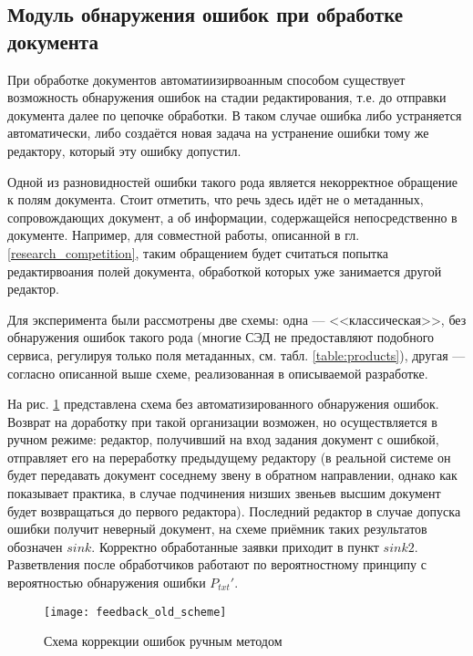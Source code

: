 \subsection{Модуль обнаружения ошибок при обработке документа} \label{research_feedback}

При обработке документов автоматиизирвоанным способом существует возможность обнаружения ошибок на стадии редактирования, т.е. до отправки документа далее по цепочке обработки. В таком случае ошибка либо устраняется автоматически, либо создаётся новая задача на устранение ошибки тому же редактору, который эту ошибку допустил.

\vspace{\baselineskip}
Одной из разновидностей ошибки такого рода является некорректное обращение к полям документа. Стоит отметить, что речь здесь идёт не о метаданных, сопровождающих документ, а об информации, содержащейся непосредственно в документе. Например, для совместной работы, описанной в гл. \ref{research_competition}, таким обращением будет считаться попытка редактирвоания полей документа, обработкой которых уже занимается другой редактор.

\vspace{\baselineskip}
Для эксперимента были рассмотрены две схемы: одна --- <<классическая>>, без обнаружения ошибок такого рода (многие СЭД не предоставляют подобного сервиса, регулируя только поля метаданных, см. табл. \ref{table:products}), другая --- согласно описанной выше схеме, реализованная в описываемой разработке.

\vspace{\baselineskip}
На рис. \ref{img:feedback_old_scheme} представлена схема без автоматизированного обнаружения ошибок. Возврат на доработку при такой организации возможен, но осуществляется в ручном режиме: редактор, получивший на вход задания документ с ошибкой, отправляет его на переработку предыдущему редактору (в реальной системе он будет передавать документ соседнему звену в обратном направлении, однако как показывает практика, в случае подчинения низших звеньев высшим документ будет возвращаться до первого редактора). Последний редактор в случае допуска ошибки получит неверный документ, на схеме приёмник таких результатов обозначен $sink$. Корректно обработанные заявки приходит в пункт $sink2$. Разветвления после обработчиков работают по вероятностному принципу с вероятностью обнаружения ошибки $P_{txt}'$.
 
\begin{figure}[h!]
  \centering
  \texttt{[image: feedback\_old\_scheme]}
  \caption{Схема коррекции ошибок ручным методом}
  \label{img:feedback_old_scheme}
\end{figure}

